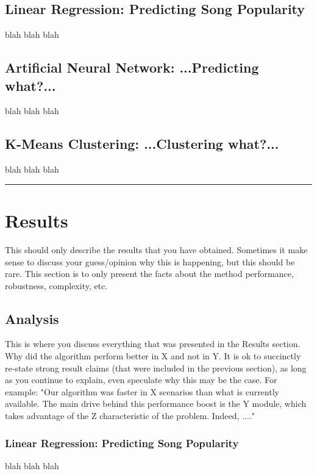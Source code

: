 \documentclass[11pt]{article}
\newcommand{\horizontalLine}{
	\begin{center}
		\hrule width 1.0\textwidth
	\end{center}
}
\begin{document}
\subsection{Linear Regression: Predicting Song Popularity}
\label{subsec:linearRegression}
blah blah blah

\subsection{Artificial Neural Network: ...Predicting what?...}
\label{subsec:ann}
blah blah blah

\subsection{K-Means Clustering: ...Clustering what?...}
\label{subsec:kMeans}
blah blah blah

\horizontalLine
\section{Results}
\label{sec:results}
This should only describe the results that you have obtained. Sometimes it make sense
to discuss your guess/opinion why this is happening, but this should be rare. This section is to
only present the facts about the method performance, robustness, complexity, etc.

\subsection{Analysis}
\label{subsec:analysis}
This is where you discuss everything that was presented in the Results section.
Why did the algorithm perform better in X and not in Y. It is ok to succinctly re-state strong
result claims (that were included in the previous section), as long as you continue to explain,
even speculate why this may be the case. For example: "Our algorithm was faster in X%
scenarios than what is currently available. The main drive behind this performance boost is the
Y module, which takes advantage of the Z characteristic of the problem. Indeed, ...."

\subsubsection{Linear Regression: Predicting Song Popularity}
\label{subsubsec:linearRegression}
blah blah blah
\end{document}
